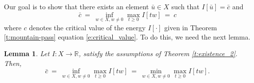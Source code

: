 \documentclass[11pt]{amsart}   	%
\theoremstyle{plain}
\numberwithin{equation}{section}
\newtheorem{lemma}[thm]{Lemma}
\def\R{\mathbb{R}}
\begin{document}


Our goal is to show that there exists an element $\bar{u} \in X$ such that $I[\bar{u}] = \bar{c}$ and
\[ \bar{c} \ = \ \inf_{w \in X, w\neq 0} \max_{t\geq 0} I[tw] \ = \ c \]
where $c$ denotes the critical value of the energy $I[\cdot]$ given in Theorem \ref{t:mountain-pass} equation \eqref{e:critical_value}.
To do this, we need the next lemma.






\begin{lemma}\label{l:min_max}
Let $I: X \longrightarrow \R$, satisfy the assumptions of Theorem \ref{t:existence_2}. Then,
\[ \bar{c} \ = \ \inf_{w \in X, w\neq 0} \max_{t\geq 0} I[tw] \ = \ \min_{w \in X, w\neq 0} \max_{t\geq 0} I[tw].  \]
\end{lemma}
\end{document}
